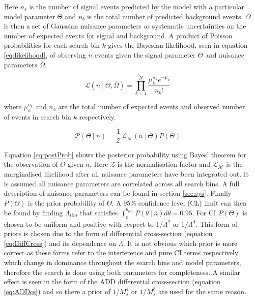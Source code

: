     Here $n_{s}$ is the number of signal events predicted by the model with a particular model parameter $\Theta$ and $n_{b}$ is the total number of predicted background events. $\overline{\Omega}$ is then a set of Gaussian nuisance parameters or systematic uncertainties on the number of expected events for signal and background. A product of Poisson probabilities for each search bin $k$ gives the Bayesian likelihood, seen in equation \ref{eq:likelihood}, of observing $n$ events given the signal parameter $\Theta$ and nuisance parameters $\overline{\Omega}$.

	\begin{equation}
		\mathcal{L}(n~|~\Theta,\overline{\Omega}) = \prod\limits^{N}_{k=1}{\frac{\mu^{n_{k}}_{k} e^{-\mu_{k}}}{n_{k}!}}
    	\label{eq:likelihood}
    \end{equation}

    where $\mu^{n_{k}}_{k}$ and $n_{k}$ are the total number of expected events and observed number of events in search bin $k$ respectively. 


	\begin{equation}
		\mathcal{P}(\Theta~|~n) = \frac{1}{\mathcal{Z}}\mathcal{L}_{\mathcal{M}}(n~|~\Theta)P(\Theta)
    	\label{eq:postProb}
    \end{equation}

    Equation \ref{eq:postProb} shows the posterior probability using Bayes' theorem for the observation of $\Theta$ given $n$. Here $\mathcal{Z}$ is the normalisation factor and $\mathcal{L}_{\mathcal{M}}$ is the marginalised likelihood after all nuisance parameters have been integrated out. It is assumed all nuisance parameters are correlated across all search bins. A full description of nuisance parameters can be found in section \ref{sec:sys}. Finally $P(\Theta)$ is the prior probability of $\Theta$. A 95\% confidence level (CL) limit can then be found by finding $\Lambda_{lim}$ that satisfies $\int_{0} ^{\theta_{lim}} P(\theta~|~\bar{n}) d\theta = 0.95$. For CI $P(\Theta)$ is chosen to be uniform and positive with respect to $1/\Lambda^{2}$ or $1/\Lambda^{4}$. This form of priors is chosen due to the form of differential cross-section (equation \ref{eq:DiffCross}) and its dependence on $\Lambda$. It is not obvious which prior is more correct as these forms refer to the interference and pure CI terms respectively which change in dominance throughout the search bins and model parameters, therefore the search is done using both parameters for completeness. A similar effect is seen in the form of the ADD differential cross-section (equation \ref{eq:ADDcs}) and so there a prior of $1/M_{s}^{4}$ or $1/M_{s}^{8}$ are used for the same reason. 

